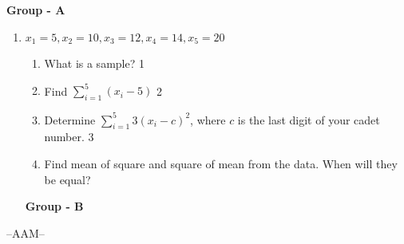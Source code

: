 \documentclass[12pt]{article}
\begin{document}
\begin{center}
\textbf{Group  - A}
\end{center}
 \begin{enumerate}
 
  \item
     \begin{center}
  \textbf{$x_1 = 5, x_2 = 10, x_3 = 12, x_4 = 14, x_5 = 20$}
  \end{center}
 
  \begin{enumerate}
    \item
	What is a sample? \hfill 1
    \item
    	Find $\displaystyle \sum_{i=1}^5 (x_i-5)$ \hfill 2
    \item
    	Determine $\displaystyle \sum_{i=1}^5 3(x_i-c)^2$, where $c$ is the last digit of your cadet number.   \hfill 3
     \item
     	Find mean of square and square of mean from the data. When will they be equal?
  \end{enumerate}

  \begin{center}
\textbf{Group  - B}
\end{center}



\end{enumerate}

 \vspace{2.5cm}

\begin{center}

  \vfill
  --AAM--
\end{center}
\end{document}
